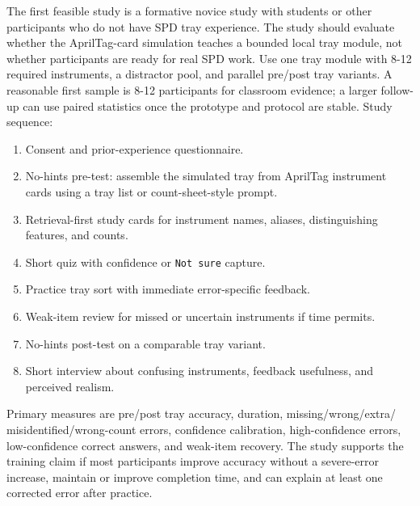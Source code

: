 \documentclass[10pt,a4paper]{article}
\begin{document}
The first feasible study is a formative novice study with students or other
participants who do not have SPD tray experience. The study should evaluate
whether the AprilTag-card simulation teaches a bounded local tray module, not
whether participants are ready for real SPD work.
Use one tray module with 8-12 required instruments, a distractor pool, and
parallel pre/post tray variants. A reasonable first sample is 8-12 participants
for classroom evidence; a larger follow-up can use paired statistics once the
prototype and protocol are stable.
Study sequence:
\begin{enumerate}
  \item Consent and prior-experience questionnaire.
  \item No-hints pre-test: assemble the simulated tray from AprilTag instrument cards using a tray list or count-sheet-style prompt.
  \item Retrieval-first study cards for instrument names, aliases, distinguishing features, and counts.
  \item Short quiz with confidence or \texttt{Not sure} capture.
  \item Practice tray sort with immediate error-specific feedback.
  \item Weak-item review for missed or uncertain instruments if time permits.
  \item No-hints post-test on a comparable tray variant.
  \item Short interview about confusing instruments, feedback usefulness, and perceived realism.
\end{enumerate}
Primary measures are pre/post tray accuracy, duration, missing/wrong/extra/
misidentified/wrong-count errors, confidence calibration, high-confidence
errors, low-confidence correct answers, and weak-item recovery. The study
supports the training claim if most participants improve accuracy without a
severe-error increase, maintain or improve completion time, and can explain at
least one corrected error after practice.
\end{document}
